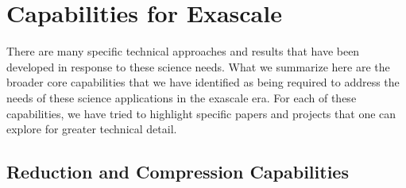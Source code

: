 \section{Capabilities for Exascale 
}
\label{sec:capabilities}

There are many specific technical approaches and results that have been developed in response to these science needs.  What we summarize here are the broader core capabilities that we have identified as being required to address the needs of these science applications in the exascale era.  For each of these capabilities, we have tried to highlight specific papers and projects that one can explore for greater technical detail.


\vspace{10px}






\subsection{Reduction and Compression Capabilities %
}
\label{sec:reduction}

